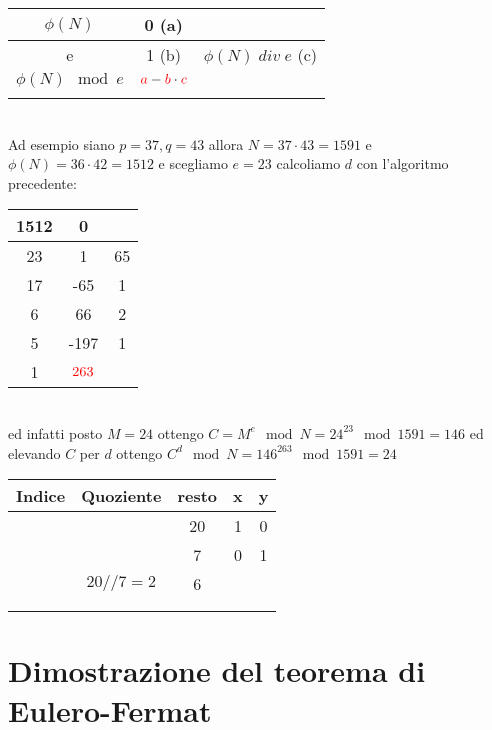 \documentclass[14pt,a4paper]{article}
\begin{document}
	\begin{tabular}{c|c|c}
		$ \phi(N) $	& 0 {\color{red}(a)}&  \\
		\hline
		e	& 1 {\color{red}(b)}&  $ \phi(N)\;div\; e$ {\color{red}(c)}\\
		\hline
		$ \phi(N) \mod e $	& $ {\color{red}a}-{\color{red}b} \cdot {\color{red}c}$ &  \\
		\hline
		&  &  \\
	\end{tabular}
	\\Ad esempio siano $ p=37, q=43 $ allora $ N=37\cdot 43=1591 $ e $ \phi(N)=36\cdot 42=1512  $ e scegliamo $ e=23 $ calcoliamo $ d  $ con l'algoritmo precedente:\\
	\begin{tabular}{c|c|c}
		1512	& 0 &  \\
		\hline
		23	& 1 & 65 \\
		\hline
		17	& -65 & 1 \\
		\hline
		6	& 66 &  2\\
		\hline
		5	& -197 & 1 \\
		\hline
		{\color{blue}1}	& $ {\color{red}263} $ &  \\
	\end{tabular}
	\\ ed infatti posto $ M=24 $ ottengo $ C=M^e \mod N=24^{23} \mod 1591= 146$ ed elevando $ C $ per $ d $ ottengo $ C^d \mod N=146^{263} \mod 1591=24 $
	
	\begin{tabular}{|c|c|c|c|c|}
		\hline
		Indice&Quoziente  &resto  & x & y \\
		\hline
		&  & 20 & 1 & 0 \\
		\hline
		&  & 7 & 0 & 1 \\
		\hline
		&$ 20//7=2 $  & 6 &  &  \\
		\hline
		&  &  &  &  \\
		\hline
		&  &  &  &  \\
		\hline
	\end{tabular}
	
	\section{Dimostrazione del teorema di Eulero-Fermat}
\end{document}
